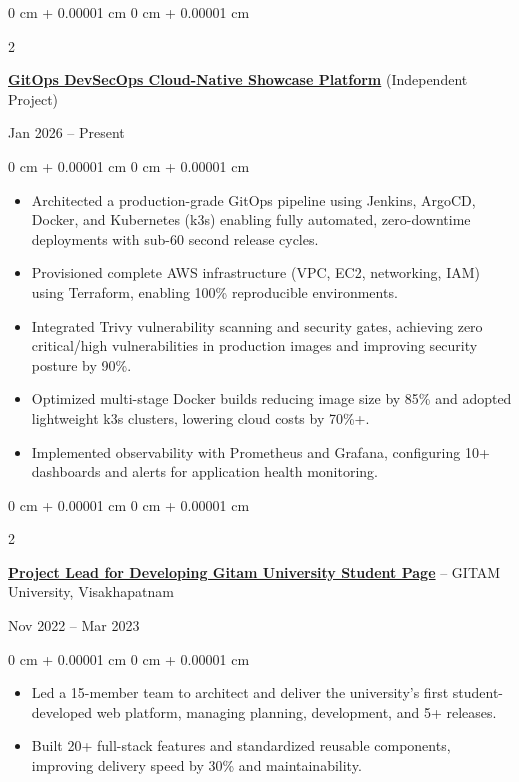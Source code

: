 \documentclass[10pt, letterpaper]{article}
\newenvironment{highlights}{
    \begin{itemize}[
        topsep=0.10 cm,
        parsep=0.10 cm,
        partopsep=0pt,
        itemsep=0pt,
        leftmargin=0 cm + 10pt
    ]
}{
    \end{itemize}
} %
\newenvironment{onecolentry}{
    \begin{adjustwidth}{
        0 cm + 0.00001 cm
    }{
        0 cm + 0.00001 cm
    }
}{
    \end{adjustwidth}
} %
\newenvironment{twocolentry}[2][]{
    \onecolentry
    \def\secondColumn{#2}
    \setcolumnwidth{\fill, 4.5 cm}
    \begin{paracol}{2}
}{
    \switchcolumn \raggedleft \secondColumn
    \end{paracol}
    \endonecolentry
} %
\begin{document}
    \begin{twocolentry}{Jan 2026 – Present}
        \textbf{\href{https://github.com/VaranasiRahul/MyPortfolio}{GitOps DevSecOps Cloud-Native Showcase Platform}} (Independent Project)
    \end{twocolentry}
    \vspace{0.10 cm}
    \begin{onecolentry}
        \begin{highlights}
        \item Architected a production-grade GitOps pipeline using Jenkins, ArgoCD, Docker, and Kubernetes (k3s) enabling fully automated, zero-downtime deployments with sub-60 second release cycles.
        \item Provisioned complete AWS infrastructure (VPC, EC2, networking, IAM) using Terraform, enabling 100\% reproducible environments.
        \item Integrated Trivy vulnerability scanning and security gates, achieving zero critical/high vulnerabilities in production images and improving security posture by 90\%.
        \item Optimized multi-stage Docker builds reducing image size by 85\% and adopted lightweight k3s clusters, lowering cloud costs by 70\%+.
        \item Implemented observability with Prometheus and Grafana, configuring 10+ dashboards and alerts for application health monitoring.
        \end{highlights}
    \end{onecolentry}

    \vspace{0.2 cm}

    \begin{twocolentry}{Nov 2022 – Mar 2023}
    \textbf{\href{https://drive.google.com/file/d/1iEg4BbHKAAMDkhGvvbMDbf_j7DofEFGA/view?usp=share_link}{Project Lead for Developing Gitam University Student Page}} -- GITAM University, Visakhapatnam
    \end{twocolentry}
    \vspace{0.10 cm}
    \begin{onecolentry}
    \begin{highlights}
    \item Led a 15-member team to architect and deliver the university’s first student-developed web platform, managing planning, development, and 5+ releases.
    \item Built 20+ full-stack features and standardized reusable components, improving delivery speed by 30\% and maintainability.
    \end{highlights}
    \end{onecolentry}
    
\end{document}
